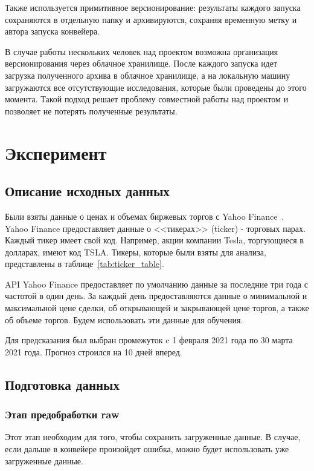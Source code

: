 \documentclass[a4paper,article,14pt]{extarticle}
\begin{document}
\par

Также используется примитивное версионирование: результаты каждого запуска сохраняются в отдельную папку и архивируются, сохраняя временную метку и автора запуска конвейера.
\par
В случае работы нескольких человек над проектом возможна организация версионирования через облачное хранилище.
После каждого запуска идет загрузка полученного архива в облачное хранилище, а на локальную машину загружаются все отсутствующие исследования, которые были проведены до этого момента.
Такой подход решает проблему совместной работы над проектом и позволяет не потерять полученные результаты.

\pagebreak
\section{Эксперимент}

\subsection{Описание исходных данных}
Были взяты данные о ценах и объемах биржевых торгов с Yahoo Finance~\cite{yahoo}.
Yahoo Finance предоставляет данные о <<тикерах>> (ticker) - торговых парах.
Каждый тикер имеет свой код. 
Например, акции компании Tesla, торгующиеся в долларах, имеют код TSLA\@.
Тикеры, которые были взяты для анализа, представлены в таблице~\ref{tab:ticker_table}.


\par
API Yahoo Finance предоставляет по умолчанию данные за последние три года с частотой в один день. 
За каждый день предоставляются данные о минимальной и максимальной цене сделки, об открывающей и закрывающей цене торгов, а также об объеме торгов.
Будем использовать эти данные для обучения.
\par
Для предсказания был выбран промежуток c 1 февраля 2021 года по 30 марта 2021 года.
Прогноз строился на 10 дней вперед.

\subsection{Подготовка данных}

\subsubsection{Этап предобработки raw}
Этот этап необходим для того, чтобы сохранить загруженные данные.
В случае, если дальше в конвейере произойдет ошибка, можно будет использовать уже загруженные данные.
\end{document}
